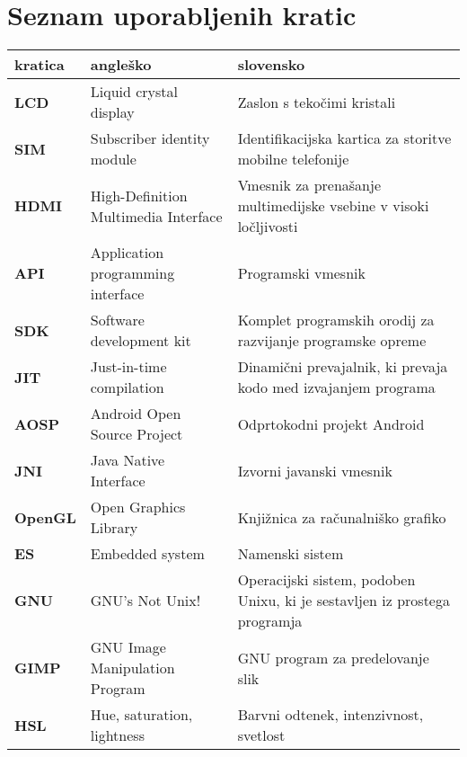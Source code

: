 \chapter*{Seznam uporabljenih kratic}

\begin{tabular}{l|p{5cm}|p{6cm}}
    {\bf kratica} & {\bf angleško} & {\bf slovensko} \\ \hline
    {\bf LCD} & Liquid crystal display & Zaslon s tekočimi kristali \\
    {\bf SIM} & Subscriber identity module & Identifikacijska kartica za storitve mobilne telefonije \\
    {\bf HDMI} & High-Definition Multimedia Interface & Vmesnik za prenašanje multimedijske vsebine v visoki ločljivosti \\
    {\bf API} & Application programming interface & Programski vmesnik \\
    {\bf SDK} & Software development kit & Komplet programskih orodij za razvijanje programske opreme \\
    {\bf JIT} & Just-in-time compilation & Dinamični prevajalnik, ki prevaja kodo med izvajanjem programa \\
    {\bf AOSP} & Android Open Source Project & Odprtokodni projekt Android \\
    {\bf JNI} & Java Native Interface & Izvorni javanski vmesnik \\
    {\bf OpenGL} & Open Graphics Library & Knjižnica za računalniško grafiko \\
    {\bf ES} & Embedded system & Namenski sistem \\
    {\bf GNU} & GNU's Not Unix! & Operacijski sistem, podoben Unixu, ki je sestavljen iz prostega programja \\
    {\bf GIMP} & GNU Image Manipulation Program & GNU program za predelovanje slik \\
    {\bf HSL} & Hue, saturation, lightness & Barvni odtenek, intenzivnost, svetlost
\end{tabular}
